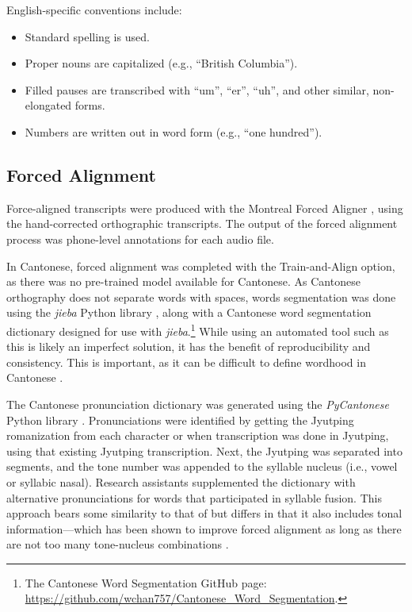 English-specific conventions include:
\begin{itemize}
 \item Standard spelling is used.
 \item Proper nouns are capitalized (e.g., ``British Columbia''). 
 \item Filled pauses are transcribed with ``um'', ``er'', ``uh'', and other similar, non-elongated forms.
 \item Numbers are written out in word form (e.g., ``one hundred'').
\end{itemize}

\subsection{Forced Alignment}\label{ch2:subsec:alignment}
Force-aligned transcripts were produced with the Montreal Forced Aligner \citep{mcauliffe_2017_mfa}, using the hand-corrected orthographic transcripts. The output of the forced alignment process was phone-level annotations for each audio file.

In Cantonese, forced alignment was completed with the Train-and-Align option, as there was no pre-trained model available for Cantonese. As Cantonese orthography does not separate words with spaces, words segmentation was done using the \textit{jieba} Python library \citep{sun_2020_jieba}, along with a Cantonese word segmentation dictionary designed for use with \textit{jieba}.\footnote{The Cantonese Word Segmentation GitHub page: \url{https://github.com/wchan757/Cantonese_Word_Segmentation}.} While using an automated tool such as this is likely an imperfect solution, it has the benefit of reproducibility and consistency. This is important, as it can be difficult to define wordhood in Cantonese \citep[e.g., see][]{wong_2006_fusion}.

The Cantonese pronunciation dictionary was generated using the \textit{PyCantonese} Python library \citep{lee_2018_pycantonese}. Pronunciations were identified by getting the Jyutping romanization from each character or when transcription was done in Jyutping, using that existing Jyutping transcription. Next, the Jyutping was separated into segments, and the tone number was appended to the syllable nucleus (i.e., vowel or syllabic nasal). Research assistants supplemented the dictionary with alternative pronunciations for words that participated in syllable fusion. This approach bears some similarity to that of \citet{tse_2019_heritage} but differs in that it also includes tonal information---which has been shown to improve forced alignment as long as there are not too many tone-nucleus combinations \citep{cavar_2016_endangered, yuan_2014_automatic}.

